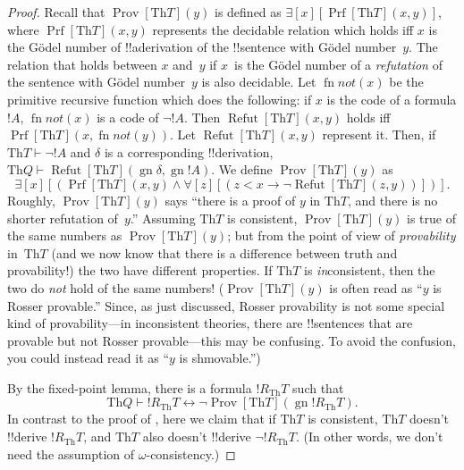 \documentclass[10pt,a4paper]{article}
\makeatletter
\theoremstyle{plain}
\theoremstyle{definition}
\theoremstyle{remark}
\newcommand*{\ollabel}[1]{\label{#1}}
\newcommand{\olref}{\@ifnextchar[{\olref@i}{\olref@final}}
\def\olref@i[#1]{\@ifnextchar[{\olref@ii}{\olref@final}}
\def\olref@ii[#1]{\@ifnextchar[{\olref@iii}{\olref@final}}
\def\olref@iii[#1]{\olref@final}
\def\olref@final#1{\ref{#1}}
\providecommand{\lif}{\mathbin{\rightarrow}}
\providecommand{\lforall}{\mathord{\forall}}
\providecommand{\lexists}{\mathord{\exists}}
\providecommand{\Proves}{\mathrel{\vdash}}
\providecommand{\Th}{\ensuremath{\mathrm{Th}}}
\providecommand{\Prf}{\operatorname{Prf}}
\providecommand{\gn}{\operatorname{gn}}
\providecommand{\liff}{\mathbin{\leftrightarrow}}
\providecommand{\OProv}{\operatorname{Prov}}
\providecommand{\OPrf}{\operatorname{Prf}}
\providecommand{\ORefut}{\operatorname{Refut}}
\providecommand{\ORProv}{\operatorname{Prov}}
\providecommand{\Refut}{\operatorname{Refut}}
\providecommand{\fn}{\operatorname{fn}}
\providecommand{\ORefut}{\operatorname{Refut}}
\providecommand{\ORProv}{\operatorname{Prov}}
\providecommand{\Refut}{\operatorname{Refut}}
\providecommand{\fn}{\operatorname{fn}}
\makeatother
\begin{document}
\begin{proof}
Recall that $\OProv[\Th{T}](y)$ is defined as $\lexists[x][\OPrf[\Th{T}](x,
  y)]$, where $\OPrf[\Th{T}](x, y)$ represents the decidable relation which
holds iff $x$ is the G\"odel number of !!a{derivation} of the
!!{sentence} with G\"odel number~$y$. The relation that holds between
$x$ and~$y$ if $x$~is the G\"odel number of a \emph{refutation} of the
sentence with G\"odel number~$y$ is also decidable. Let $\fn{not}(x)$
be the primitive recursive function which does the following: if $x$
is the code of a formula $!A$, $\fn{not}(x)$ is a code of $\lnot
!A$. Then $\Refut[\Th{T}](x, y)$ holds iff $\Prf[\Th{T}](x, \fn{not}(y))$.  Let
$\ORefut[\Th{T}](x, y)$ represent it.  Then, if $\Th{T} \Proves \lnot !A$
and $\delta$ is a corresponding !!{derivation}, $\Th{Q} \Proves
\ORefut[\Th{T}](\gn{\delta}, \gn{!A})$.  We define $\ORProv[\Th{T}](y)$ as
\[
\lexists[x][(\OPrf[\Th{T}](x,y) \land \lforall[z][(z < x \lif \lnot
  \ORefut[\Th{T}](z,y))])].
\]
Roughly, $\ORProv[\Th{T}](y)$ says ``there is a proof of $y$ in $\Th{T}$,
and there is no shorter refutation of~$y$.''  Assuming $\Th{T}$ is
consistent, $\ORProv[\Th{T}](y)$ is true of the same numbers as
$\OProv[\Th{T}](y)$; but from the point of view of \emph{provability}
in~$\Th{T}$ (and we now know that there is a difference between truth
and provability!) the two have different properties. If $\Th{T}$ is
\emph{in}consistent, then the two do \emph{not} hold of the same
numbers!{} ($\ORProv[\Th{T}](y)$ is often read as ``$y$ is Rosser
provable.'' Since, as just discussed, Rosser provability is not some
special kind of provability---in inconsistent theories, there are
!!{sentence}s that are provable but not Rosser provable---this may be
confusing. To avoid the confusion, you could instead read it as
``$y$ is shmovable.'')

By the fixed-point lemma, there is a formula $!R_\Th{T}$ such that
\begin{equation}
  \Th{Q} \Proves !R_\Th{T} \liff \lnot \ORProv[\Th{T}](\gn{!R_\Th{T}}).
  \ollabel{RT}
\end{equation}
In contrast to the proof of \olref[1in]{thm:first-incompleteness},
here we claim that if $\Th{T}$ is consistent, $\Th{T}$ doesn't !!{derive}
$!R_\Th{T}$, and $\Th{T}$ also doesn't !!{derive} $\lnot !R_\Th{T}$. (In
other words, we don't need the assumption of $\omega$-consistency.)


\end{proof}
\end{document}
